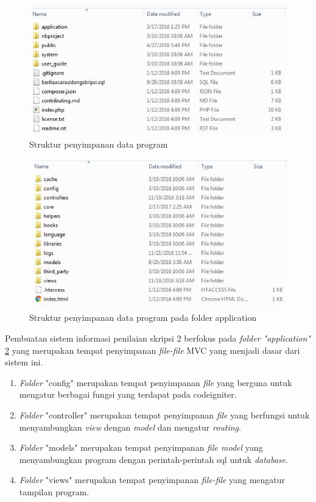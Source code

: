 		\begin{figure}[H]
			\centering
			\includegraphics[scale= 1.0]{Gambar/strukturFile}
			\caption {Struktur penyimpanan data program}
			\label{fig:strukturFile}
		\end{figure}
		\begin{figure}[H]
			\centering
			\includegraphics[scale= 1.0]{Gambar/strukturFileApp}
			\caption {Struktur penyimpanan data program pada folder application}
			\label{fig:strukturFileApp}
		\end{figure}
		
		Pembuatan sistem informasi penilaian skripsi 2 berfokus pada \textit{folder "application"} \ref{fig:strukturFileApp} yang merupakan tempat penyimpanan \textit{file-file} MVC yang menjadi dasar dari sistem ini.
		
		\begin{enumerate}
			\item \textit{Folder} "config" merupakan tempat penyimpanan \textit{file} yang berguna untuk mengatur berbagai fungsi yang terdapat pada codeigniter.
			\item \textit{Folder} "controller" merupakan tempat penyimpanan \textit{file} yang berfungsi untuk menyambungkan \textit{view} dengan \textit{model} dan mengatur \textit{routing}.
			\item \textit{Folder} "models" merupakan tempat penyimpanan \textit{file model} yang menyambungkan program dengan perintah-perintah sql untuk \textit{database}.
			\item \textit{Folder} "views" merupakan tempat penyimpanan \textit{file-file} yang mengatur tampilan program.
		\end{enumerate}
		
